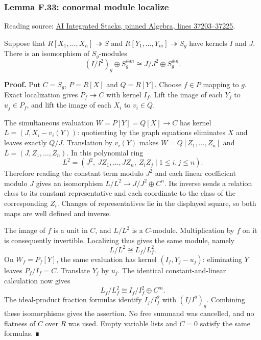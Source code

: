 \documentclass[11pt,a4paper,openany]{report}
\begin{document}
\label{AG-RG-S05-algebra-lemma-conormal-module-localize}

\subsubsection{Lemma F.33: conormal module localize}\label{AG-RG-S05-lemma-f.33-conormal-module-localize}

Reading source: \href{https://github.com/KokunoYumeto/unofficial-stacks-project-ai-drafts/blob/565b10e987aba5969b21145a0833f42d69f96790/algebra.tex\#L37203-L37225}{AI Integrated Stacks, pinned Algebra, lines 37203--37225}.

Suppose that \(R[X_1,\ldots,X_n]\twoheadrightarrow S\) and \(R[Y_1,\ldots,Y_m]\twoheadrightarrow S_g\) have kernels \(I\) and \(J\). There is an isomorphism of \(S_g\)-modules \[(I/I^2)_g\oplus S_g^{\oplus m}
\cong J/J^2\oplus S_g^{\oplus n}.\]

\textbf{Proof.} Put \(C=S_g\), \(P=R[X]\) and \(Q=R[Y]\). Choose \(f\in P\) mapping to \(g\). Exact localization gives \(P_f\twoheadrightarrow C\) with kernel \(I_f\). Lift the image of each \(Y_j\) to \(u_j\in P_f\), and lift the image of each \(X_i\) to \(v_i\in Q\).

The simultaneous evaluation \(W=P[Y]=Q[X]\to C\) has kernel \(L=(J,X_i-v_i(Y))\): quotienting by the graph equations eliminates \(X\) and leaves exactly \(Q/J\). Translation by \(v_i(Y)\) makes \(W=Q[Z_1,\ldots,Z_n]\) and \(L=(J,Z_1,\ldots,Z_n)\). In this polynomial ring \[L^2=(J^2,\ JZ_1,\ldots,JZ_n,\ Z_iZ_j\mid1\leq i,j\leq n).\] Therefore reading the constant term modulo \(J^2\) and each linear coefficient modulo \(J\) gives an isomorphism \(L/L^2\to J/J^2\oplus C^n\). Its inverse sends a relation class to its constant representative and each coordinate to the class of the corresponding \(Z_i\). Changes of representatives lie in the displayed square, so both maps are well defined and inverse.

The image of \(f\) is a unit in \(C\), and \(L/L^2\) is a \(C\)-module. Multiplication by \(f\) on it is consequently invertible. Localizing thus gives the same module, namely \[L/L^2\cong L_f/L_f^2.\] On \(W_f=P_f[Y]\), the same evaluation has kernel \((I_f,Y_j-u_j)\): eliminating \(Y\) leaves \(P_f/I_f=C\). Translate \(Y_j\) by \(u_j\). The identical constant-and-linear calculation now gives \[L_f/L_f^2\cong I_f/I_f^2\oplus C^m.\] The ideal-product fraction formulas identify \(I_f/I_f^2\) with \((I/I^2)_g\). Combining these isomorphisms gives the assertion. No free summand was cancelled, and no flatness of \(C\) over \(R\) was used. Empty variable lists and \(C=0\) satisfy the same formulas. ∎
\end{document}
